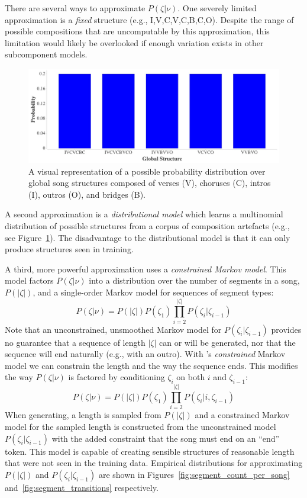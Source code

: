 \documentclass[letterpaper]{article}
\begin{document}
There are several ways to approximate $P(\zeta|\nu)$. One severely limited approximation is a \textit{fixed} structure (e.g., I,V,C,V,C,B,C,O). Despite the range of possible compositions that are uncomputable by this approximation, this limitation would likely be overlooked if enough variation exists in other subcomponent models.

\begin{figure}
	\centering
	\includegraphics[width=\linewidth]{global_structure}
	\caption{\label{fig:global_structure} A visual representation of a possible probability distribution over global song structures composed of verses (V), choruses (C), intros (I), outros (O), and bridges (B).}
\end{figure}

A second approximation is a \textit{distributional model} which learns a multinomial distribution of possible structures from a corpus of composition artefacts (e.g., see Figure~\ref{fig:global_structure}). The disadvantage to the distributional model is that it can only produce structures seen in training. 

A third, more powerful approximation uses a \textit{constrained Markov model}. This model factors $P(\zeta|\nu)$ into a distribution over the number of segments in a song, $P(|\zeta|)$, and a single-order Markov model for sequences of segment types:
\[ P(\zeta|\nu) = P(|\zeta|) P(\zeta_1) \prod_{i=2}^{|\zeta|} P(\zeta_i|\zeta_{i-1}) \]
\noindent Note that an unconstrained, unsmoothed Markov model for $P(\zeta_i|\zeta_{i-1})$ provides no guarantee that a sequence of length $|\zeta|$ can or will be generated, nor that the sequence will end naturally (e.g., with an outro). With \citeauthor{pachet2001finite}'s \emph{constrained} Markov model we can constrain the length and the way the sequence ends. This modifies the way $P(\zeta|\nu)$ is factored by conditioning $\zeta_i$ on both $i$ and $\zeta_{i-1}$:
\[ P(\zeta|\nu) = P(|\zeta|) P(\zeta_1) \prod_{i=2}^{|\zeta|} P(\zeta_i|i,\zeta_{i-1}) \]
When generating, a length is sampled from $P(|\zeta|)$ and a constrained Markov model for the sampled length is constructed from the unconstrained model $P(\zeta_i|\zeta_{i-1})$ with the added constraint that the song must end on an ``end'' token. This model is capable of creating sensible structures of reasonable length that were not seen in the training data. Empirical distributions for approximating $P(|\zeta|)$ and $P(\zeta_i|\zeta_{i-1})$ are shown in Figures~\ref{fig:segment_count_per_song} and~\ref{fig:segment_transitions} respectively.
\end{document}
